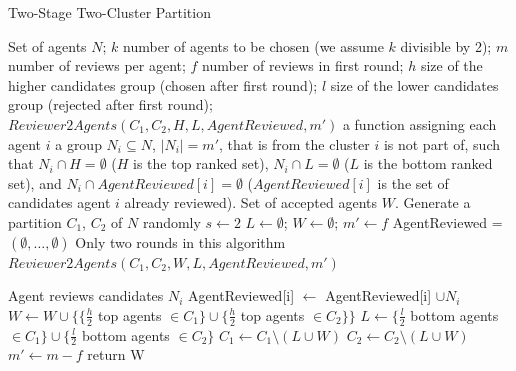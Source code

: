 \documentclass[letterpaper]{article} %
\begin{document}
\begin{algorithm}[t]
\small
\caption{Two-Stage Two-Cluster Partition}\label{2StagePartition}
\begin{algorithmic}[1]
\Require
Set of agents $N$; %
\newline
$k$ number of agents to be chosen (we assume $k$ divisible by 2);
\newline
$m$ number of reviews per agent;
\newline
$f$ number of reviews in first round;
\newline
$h$ size of the higher candidates group (chosen after first round);
\newline
$l$ size of the lower candidates group (rejected after first round);
\newline
$Reviewer2Agents(C_{1},C_{2},H,L,AgentReviewed,m')$ a function assigning each agent $i$ a group $N_{i}\subseteq N$, $|N_{i}|=m'$, that is from the cluster $i$ is not part of, such that $N_{i}\cap H=\emptyset$ ($H$ is the top ranked set), $N_{i}\cap L=\emptyset$ ($L$ is the bottom ranked set), and $N_{i}\cap AgentReviewed[i]=\emptyset$ ($AgentReviewed[i]$ is the set of candidates agent $i$ already reviewed).
\newline
\Ensure Set of accepted agents $W$.
\State Generate a partition {$C_{1}$, $C_{2}$} of $N$ randomly
\State $s \gets 2$ 
\State $L \gets \emptyset$; 
\State $W \gets \emptyset$; 
\State $m' \gets f$ 
\State AgentReviewed = $(\emptyset , \ldots , \emptyset)$
 \Comment Only two rounds in this algorithm
\State $Reviewer2Agents(C_{1},C_{2},W,L,AgentReviewed,m')$

\State Agent reviews candidates $N_{i}$ %
\State AgentReviewed[i] $\gets$ AgentReviewed[i] $\cup N_{i}$
\EndFor
\State $W \gets W \cup \{ \{ \frac{h}{2}$ top agents $\in C_{1} \} \cup \{ \frac{h}{2}$ top agents $\in C_{2} \} \}$
\State $L \gets \{ \frac{l}{2}$ bottom agents $\in C_{1} \} \cup \{ \frac{l}{2}$ bottom agents $\in C_{2} \}$
\State $C_{1}\gets C_{1}\setminus (L\cup W)$
\State $C_{2}\gets C_{2}\setminus (L\cup W)$
\State $m' \gets m-f$
\EndFor
\State return W
\end{algorithmic}
\end{algorithm}
\normalsize
\end{document}
